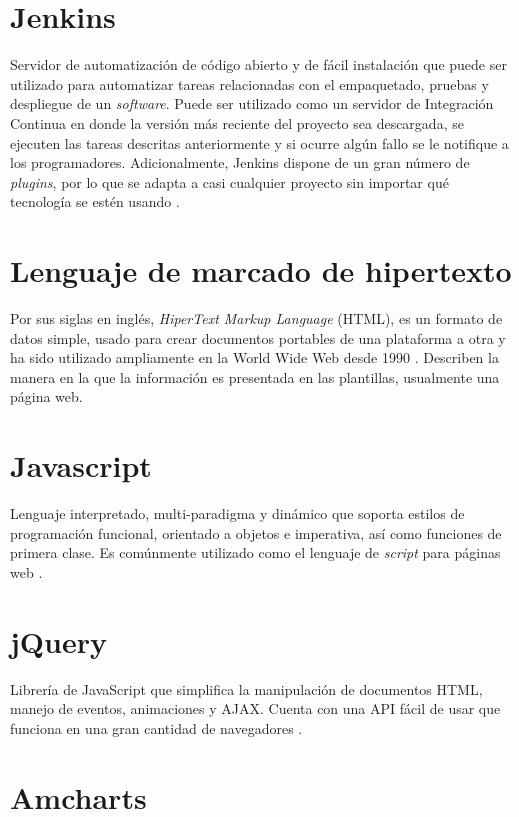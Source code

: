 \section{Jenkins}

Servidor de automatización de código abierto y de fácil instalación que puede ser utilizado para automatizar tareas relacionadas con el empaquetado, pruebas y despliegue de un \textit{software}. Puede ser utilizado como un servidor de Integración Continua en donde la versión más reciente del proyecto sea descargada, se ejecuten las tareas descritas anteriormente y si ocurre algún fallo se le notifique a los programadores. Adicionalmente, Jenkins dispone de un gran número de \textit{plugins}, por lo que se adapta a casi cualquier proyecto sin importar qué tecnología se estén usando \cite{Jenkins}.

\section{ Lenguaje de marcado de hipertexto}

Por sus siglas en inglés, \textit{HiperText Markup Language} (HTML), es un formato de datos simple, usado para crear documentos portables de una plataforma a otra y ha sido utilizado ampliamente en la World Wide Web desde 1990 \cite{RFC1866}. Describen la manera en la que la información es presentada en las plantillas, usualmente una página web.

\section{Javascript}

Lenguaje interpretado, multi-paradigma y dinámico que soporta estilos de programación funcional,  orientado a objetos e imperativa, así como funciones de primera clase. Es comúnmente utilizado como el lenguaje de \textit{script} para páginas web \cite{javascript}.

\section{jQuery}

Librería de JavaScript que simplifica la manipulación de documentos HTML, manejo de eventos, animaciones y AJAX. Cuenta con una API fácil de usar que funciona en una gran cantidad de navegadores \cite{jquery}.

\section{Amcharts}

